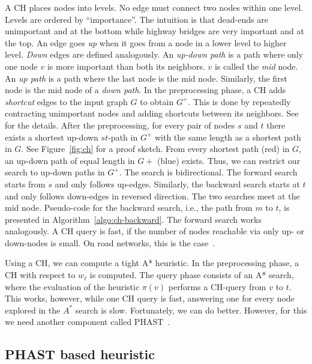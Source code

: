 \documentclass[letterpaper]{article} %
\begin{document}
A CH places nodes into levels.
No edge must connect two nodes within one level.
Levels are ordered by ``importance''.
The intuition is that dead-ends are unimportant and at the bottom while highway bridges are very important and at the top.
An edge goes \emph{up} when it goes from a node in a lower level to higher level.
\emph{Down} edges are defined analogously.
An \emph{up-down path} is a path where only one node $v$ is more important than both its neighbors.
$v$ is called the \emph{mid} node.
An \emph{up path} is a path where the last node is the mid node.
Similarly, the first node is the mid node of a \emph{down path}.
%
In the preprocessing phase, a CH adds \emph{shortcut} edges to the input graph $G$ to obtain $G^+$.
This is done by repeatedly contracting unimportant nodes and adding shortcuts between its neighbors.
See~\cite{gssv-erlrn-12} for the details.
After the preprocessing, for every pair of nodes $s$ and $t$ there exists a shortest up-down $st$-path in $G^+$ with the same length as a shortest path in $G$.
See Figure~\ref{fig:ch} for a proof sketch.
From every shortest path (red) in $G$, an up-down path of equal length in $G+$ (blue) exists.
Thus, we can restrict our search to up-down paths in $G^+$.
The search is bidirectional.
The forward search starts from $s$ and only follows up-edges.
Similarly, the backward search starts at $t$ and only follows down-edges in reversed direction.
The two searches meet at the mid node.
Pseudo-code for the backward search, i.e., the path from $m$ to $t$, is presented in Algorithm~\ref{algo:ch-backward}.
The forward search works analogously.
%
A CH query is fast, if the number of nodes reachable via only up- or down-nodes is small.
On road networks, this is the case~\cite{gssv-erlrn-12,dgrw-gpnc-11,dgpw-crprn-13,dsw-cch-15,hs-gbpo-18}.

Using a CH, we can compute a tight A* heuristic.
In the preprocessing phase, a CH with respect to $w_\ell$ is computed.
The query phase consists of an A* search, where the evaluation of the heuristic $\pi(v)$ performs a CH-query from $v$ to $t$.
%
This works, however, while one CH query is fast, answering one for every node explored in the $A^*$ search is slow.
Fortunately, we can do better.
However, for this we need another component called PHAST~\cite{dgnw-phast-13}.

\subsection{PHAST based heuristic}
\end{document}
